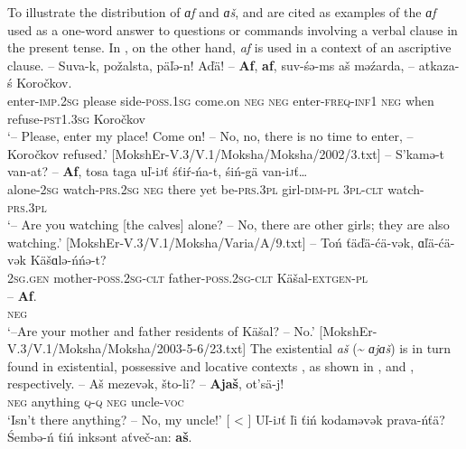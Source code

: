 \documentclass[output=paper]{langsci/langscibook}
\begin{document}
  To illustrate the distribution of \textit{ɑf} and \textit{ɑš},  and  are cited as examples of the \textit{ɑf} used as a one-word answer to questions or commands involving a verbal clause in the present tense. In , on the other hand, \textit{af} is used in a context of an ascriptive clause. 
\ea\label{ex:moksha-Korochkov}
\gll -- Suva-k, požalsta, päľə-n! Aďä! -- \textbf{Af}, \textbf{af}, suv-śə-ms aš məźarda, -- atkaza-ś Koročkov.\\
{} enter-\textsc{imp.2sg} please side-\textsc{poss.1sg} come.on {} \textsc{neg} \textsc{neg} enter-\textsc{freq-inf1}  \textsc{neg} when {} refuse-\textsc{pst1.3sg} Koročkov\\
\glt `-- Please, enter my place! Come on! -- No, no, there is no time to enter, -- Koročkov refused.' [MokshEr-V.3/V.1/Moksha/Moksha/2002/3.txt]
\z 
\ea\label{ex:moksha-watching}
\gll -- S’kamə-t van-at? -- \textbf{Af}, tosa taga uľ-i\textsc{j}ť śťiŕ-ńa-t, śiń-gä van-i\textsc{j}ť\ldots\\
{} alone-\textsc{2sg} watch-\textsc{prs.2sg} {} \textsc{neg} there yet be-\textsc{prs.3pl} girl-\textsc{dim-pl} \textsc{3pl-clt} watch-\textsc{prs.3pl}\\
\glt `-- Are you watching [the calves] alone? -- No, there are other girls; they are also watching.' [MokshEr-V.3/V.1/Moksha/Varia/A/9.txt]
\z
\ea\label{ex:moksha-residents}
\gll -- Toń ťäďä-ćä-vək, ɑľä-ćä-vək Käšɑlə-ńńə-t?\\
{} \textsc{2sg.gen} mother-\textsc{poss.2sg-clt} father-\textsc{poss.2sg-clt} Käšal-\textsc{extgen-pl}\\
\sn
\gll -- \textbf{Af}.\\
{} \textsc{neg}\\
\glt `--Are your mother and father residents of Käšal? -- No.' [MokshEr-V.3/V.1/Moksha/Moksha/2003-5-6/23.txt]
\z
The existential \textit{aš} (\textasciitilde{} \textit{ɑjɑš}) is in turn found in existential, possessive and locative contexts \citep[270]{Hamari2007}, as shown in ,  and , respectively. 
\ea\label{ex:moksha-uncle}
\gll -- Aš mezevək, što-li? -- \textbf{Ajaš}, ot’sä-j!\\
{} \textsc{neg} anything \textsc{q-q} {} \textsc{neg} uncle-\textsc{voc}\\
\glt `Isn't there anything? -- No, my uncle!' [\citealt[270]{Hamari2007} < \citealt[888]{PaasonenRavila1947}]
\z
\ea\label{ex:moksha-right}
\gll Uľ-i\textsc{j}ť ľi ťiń kodaməvək prava-ńťä? Śembə-ń ťiń inksənt aťveč-an: \textbf{aš}.\\
\end{document}
